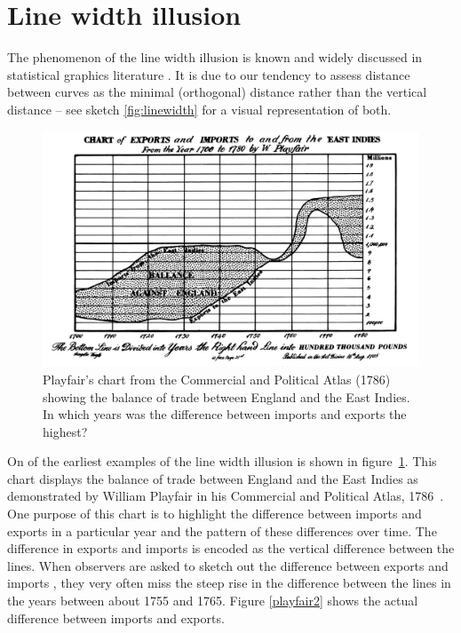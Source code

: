 \documentclass[journal]{vgtc}\usepackage{graphicx, color}
\begin{document}
\section{Line width illusion}


The  phenomenon of the line width illusion  is known and widely discussed in statistical graphics literature \citep{cleveland:1984, tufte, wainer:2000, robbins:2005}. It  is due to our  tendency to assess distance between curves as the minimal (orthogonal) distance rather than the  vertical distance -- see sketch \ref{fig:linewidth} for a visual representation of both.


\begin{figure}
\includegraphics[width=.9\linewidth]{images/playfair_east_indies_gross}
\caption{\label{playfair}
Playfair's chart from the Commercial and Political Atlas (1786) showing the balance of trade between England and the East Indies.  In which years was the difference between imports and exports the highest? }
\end{figure}
On of the earliest examples of the line width illusion is shown in  figure~\ref{playfair}. This chart displays the balance of trade between England and the East Indies as demonstrated by William Playfair in his Commercial and Political Atlas, 1786~\citep{playfair, playfair2}.  One purpose of this chart is to highlight the difference between imports and exports in a particular year and the pattern of these differences over  time. The difference in exports and imports is encoded as the vertical difference between the lines. When observers are asked to sketch out the difference between exports and imports  \citep{cleveland:1984}, they very often  miss the steep rise in the difference between the lines in the years between about 1755 and 1765. Figure \ref{playfair2} shows the  actual difference between imports and exports. 
\end{document}
